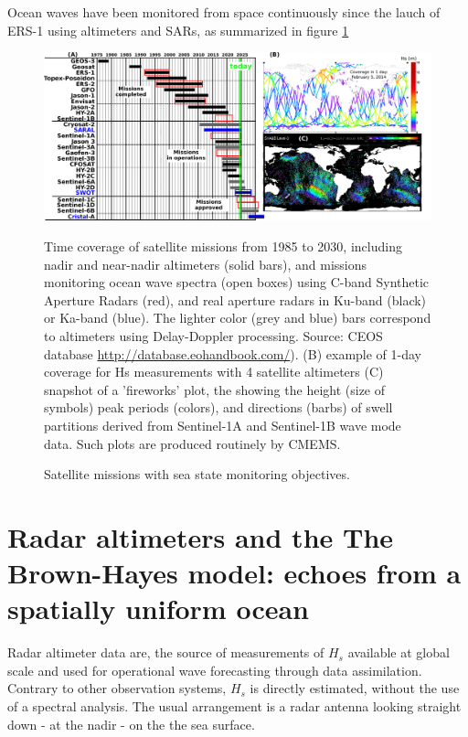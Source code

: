 Ocean waves have been monitored from space continuously since the lauch of ERS-1 using altimeters and SARs, as summarized in figure \ref{fig:satellite}
\begin{figure}[htb]
\centerline{\includegraphics[width=\textwidth]{FIGS_CH_SAT/missions.pdf}}
  \caption{Satellite missions with sea state monitoring objectives.}
    {Time coverage of satellite missions from 1985 to 2030, including nadir and near-nadir altimeters (solid bars), and missions monitoring ocean wave spectra (open boxes) using C-band Synthetic Aperture Radars (red), and real aperture radars in Ku-band (black) or Ka-band (blue). The lighter color (grey and blue) bars correspond to altimeters using Delay-Doppler processing. Source: CEOS database
    \url{http://database.eohandbook.com/}). (B) example of 1-day coverage for Hs measurements with 4 satellite altimeters 
    (C) snapshot of a 'fireworks' plot, the showing the height (size of symbols) peak periods (colors), and directions (barbs) of 
    swell partitions derived from Sentinel-1A and Sentinel-1B wave mode data. Such plots are produced routinely by CMEMS.}\label{fig:satellite}
\end{figure}

\section{Radar altimeters and the The Brown-Hayes model: echoes from a spatially uniform ocean}
Radar altimeter data are, the source of measurements of $H_s$  available at global scale and used for operational wave forecasting
through data assimilation. Contrary to other observation systems, $H_s$ is directly estimated, without the use of a spectral analysis. The usual 
arrangement is a radar antenna looking straight down - at the nadir - on the the sea surface. 

